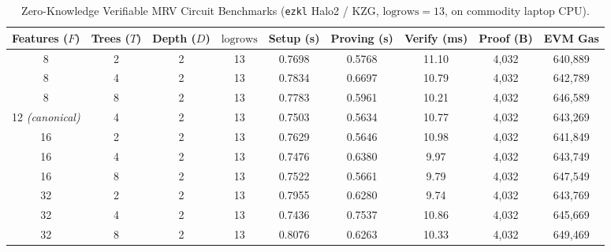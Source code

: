 \begin{table}[t]
\centering
\small
\caption{Zero-Knowledge Verifiable MRV Circuit Benchmarks (\texttt{ezkl} Halo2 / KZG, $\text{logrows} = 13$, on commodity laptop CPU).}
\label{tab:zk_benchmarks}
\begin{tabular}{ccccccccc}
\hline
\textbf{Features ($F$)} & \textbf{Trees ($T$)} & \textbf{Depth ($D$)} & \textbf{$\text{logrows}$} & \textbf{Setup (s)} & \textbf{Proving (s)} & \textbf{Verify (ms)} & \textbf{Proof (B)} & \textbf{EVM Gas} \\
\hline
8 & 2 & 2 & 13 & 0.7698 & 0.5768 & 11.10 & 4,032 & 640,889 \\
8 & 4 & 2 & 13 & 0.7834 & 0.6697 & 10.79 & 4,032 & 642,789 \\
8 & 8 & 2 & 13 & 0.7783 & 0.5961 & 10.21 & 4,032 & 646,589 \\
12 \textit{(canonical)} & 4 & 2 & 13 & 0.7503 & 0.5634 & 10.77 & 4,032 & 643,269 \\
16 & 2 & 2 & 13 & 0.7629 & 0.5646 & 10.98 & 4,032 & 641,849 \\
16 & 4 & 2 & 13 & 0.7476 & 0.6380 & 9.97 & 4,032 & 643,749 \\
16 & 8 & 2 & 13 & 0.7522 & 0.5661 & 9.79 & 4,032 & 647,549 \\
32 & 2 & 2 & 13 & 0.7955 & 0.6280 & 9.74 & 4,032 & 643,769 \\
32 & 4 & 2 & 13 & 0.7436 & 0.7537 & 10.86 & 4,032 & 645,669 \\
32 & 8 & 2 & 13 & 0.8076 & 0.6263 & 10.33 & 4,032 & 649,469 \\
\hline
\end{tabular}
\end{table}
